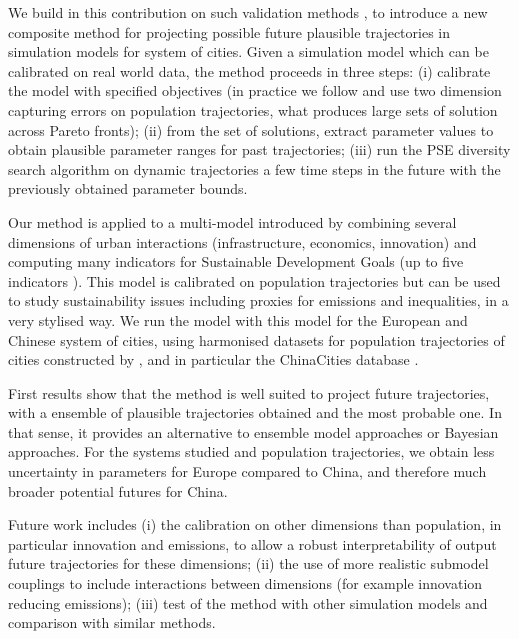 \documentclass[11pt]{article}
\begin{document}
We build in this contribution on such validation methods \cite{raimbault2019methods}, to introduce a new composite method for projecting possible future plausible trajectories in simulation models for system of cities. Given a simulation model which can be calibrated on real world data, the method proceeds in three steps: (i) calibrate the model with specified objectives (in practice we follow \cite{raimbault2020indirect} and use two dimension capturing errors on population trajectories, what produces large sets of solution across Pareto fronts); (ii) from the set of solutions, extract parameter values to obtain plausible parameter ranges for past trajectories; (iii) run the PSE diversity search algorithm on dynamic trajectories a few time steps in the future with the previously obtained parameter bounds.

Our method is applied to a multi-model introduced by \cite{raimbault2022trade} combining several dimensions of urban interactions (infrastructure, economics, innovation) and computing many indicators for Sustainable Development Goals (up to five indicators \cite{raimbault2024simulation}). This model is calibrated on population trajectories but can be used to study sustainability issues including proxies for emissions and inequalities, in a very stylised way. We run the model with this model for the European and Chinese system of cities, using harmonised datasets for population trajectories of cities constructed by \cite{cura2017old}, and in particular the ChinaCities database \cite{swerts2017data}.

First results show that the method is well suited to project future trajectories, with a ensemble of plausible trajectories obtained and the most probable one. In that sense, it provides an alternative to ensemble model approaches or Bayesian approaches. For the systems studied and population trajectories, we obtain less uncertainty in parameters for Europe compared to China, and therefore much broader potential futures for China. 

Future work includes (i) the calibration on other dimensions than population, in particular innovation and emissions, to allow a robust interpretability of output future trajectories for these dimensions; (ii) the use of more realistic submodel couplings to include interactions between dimensions (for example innovation reducing emissions); (iii) test of the method with other simulation models and comparison with similar methods.


{\small


}
\end{document}
